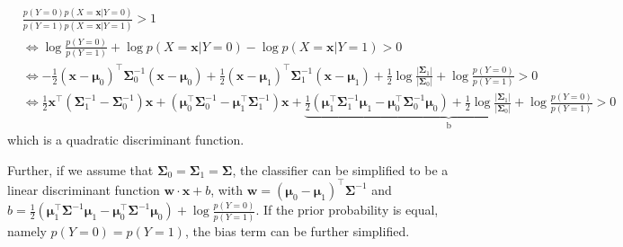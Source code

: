 \documentclass{article}
\begin{document}
	\begin{equation*}
	\begin{split}
	&\frac{p(Y=0) p(X=\bm{x}|Y=0)}{p(Y=1) p(X=\bm{x}|Y=1)} > 1 \\
	&\iff \log \frac{p(Y=0)}{p(Y=1)} + \log p(X=\bm{x}|Y=0) - \log p(X=\bm{x}|Y=1) > 0 \\
	&\iff -\frac{1}{2}(\bm{x}-\bm{\mu}_0)^\top \bm{\Sigma}_0^{-1}(\bm{x}-\bm{\mu}_0) + \frac{1}{2}(\bm{x}-\bm{\mu}_1)^\top \bm{\Sigma}_1^{-1}(\bm{x}-\bm{\mu}_1) +  \frac{1}{2}\log\frac{|\bm{\Sigma}_1|}{|\bm{\Sigma}_0|} + \log \frac{p(Y=0)}{p(Y=1)} > 0 \\
	&\iff \frac{1}{2} \bm{x}^\top ( \bm{\Sigma}_1^{-1} - \bm{\Sigma}_0^{-1}) \bm{x} + (\bm{\mu}_0^\top\bm{\Sigma}_0^{-1} - \bm{\mu}_1^\top\bm{\Sigma}_1^{-1}) \bm{x} + \underbrace{\frac{1}{2} (\bm{\mu}_1^\top\bm{\Sigma}_1^{-1}\bm{\mu}_1 - \bm{\mu}_0^\top\bm{\Sigma}_0^{-1}\bm{\mu}_0 ) + \frac{1}{2}\log\frac{|\bm{\Sigma}_1|}{|\bm{\Sigma}_0|} + \log \frac{p(Y=0)}{p(Y=1)}}_{\mathrm{b}} > 0
	\end{split}
	\end{equation*}
which is a quadratic discriminant function.

	Further, if we assume that $\bm{\Sigma}_0=\bm{\Sigma}_1=\bm{\Sigma}$, the classifier can be simplified to be a linear discriminant function $\bm{w}\cdot\bm{x}+b$, with $\bm{w}=(\bm{\mu}_0 - \bm{\mu}_1)^\top\bm{\Sigma}^{-1}$ and $b=\frac{1}{2} (\bm{\mu}_1^\top\bm{\Sigma}^{-1}\bm{\mu}_1 - \bm{\mu}_0^\top\bm{\Sigma}^{-1}\bm{\mu}_0 ) + \log \frac{p(Y=0)}{p(Y=1)}$. If the prior probability is equal, namely $p(Y=0)=p(Y=1)$, the bias term can be further simplified.
	
\end{document}

